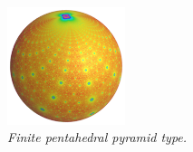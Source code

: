 \begin{figure}[H]
\begin{minipage}{0.5\textwidth}
  \hspace*{\fill}
  \begin{minipage}[t]{0.24\textwidth}
   \centering
   \includegraphics[width=1.35in, height=1.35in, keepaspectratio]{./img/application/sphairahedron/variations/pentahedralPyramid/limitset2.png}
  \end{minipage}
  \hspace*{\fill}
  \caption{\textit{Finite pentahedral pyramid type.}}
  \label{fig:pentahedralPyramid}
 \end{minipage}
\end{figure}


